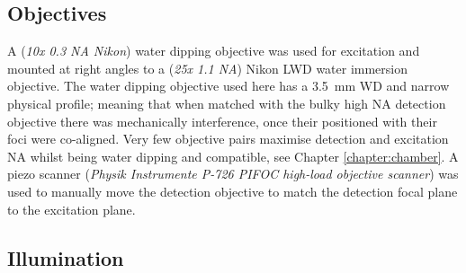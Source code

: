 
\subsection{Objectives}


A (\emph{10x 0.3 NA Nikon}) water dipping objective was used for excitation and mounted at right angles to a (\emph{25x 1.1 NA}) Nikon LWD water immersion objective.
The water dipping objective used here has a \SI{3.5}{\milli\meter} WD and narrow physical profile; meaning that when matched with the bulky high NA detection objective there was mechanically interference, once their positioned with their foci were co-aligned.
Very few objective pairs maximise detection and excitation NA whilst being water dipping and compatible, see Chapter \ref{chapter:chamber}.
A piezo scanner (\emph{Physik Instrumente P-726 PIFOC high-load objective scanner}) was used to manually move the detection objective to match the detection focal plane to the excitation plane.

\subsection{Illumination}

